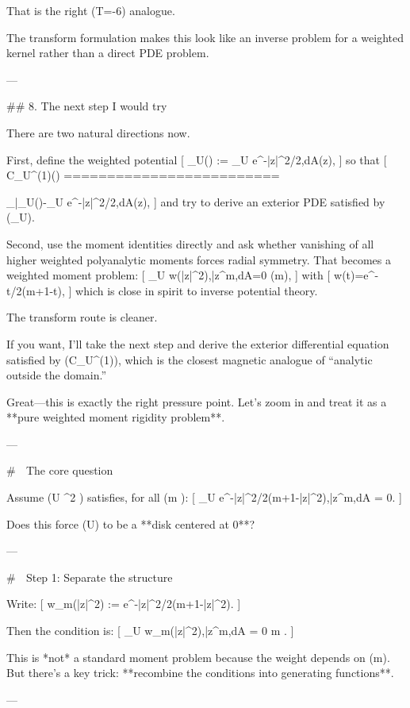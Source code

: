That is the right (T=-6) analogue.

The transform formulation makes this look like an inverse problem for a weighted kernel rather than a direct PDE problem.

---

## 8. The next step I would try

There are two natural directions now.

First, define the weighted potential
[
\Phi_U(\zeta)
:=
\int_U e^{-|z|^2/2},dA(z),
]
so that
[
\mathcal C_U^{(1)}(\zeta)
=========================

\partial_{\bar\zeta}\Phi_U(\zeta)-\int_U e^{-|z|^2/2},dA(z),
]
and try to derive an exterior PDE satisfied by (\Phi_U).

Second, use the moment identities directly and ask whether vanishing of all higher weighted polyanalytic moments forces radial symmetry. That becomes a weighted moment problem:
[
\int_U w(|z|^2),\bar z^m,dA=0
\quad(m),
]
with
[
w(t)=e^{-t/2}(m+1-t),
]
which is close in spirit to inverse potential theory.

The transform route is cleaner.

If you want, I’ll take the next step and derive the exterior differential equation satisfied by (\mathcal C_U^{(1)}), which is the closest magnetic analogue of “analytic outside the domain.”


Great—this is exactly the right pressure point. Let’s zoom in and treat it as a **pure weighted moment rigidity problem**.

---

# 🎯 The core question

Assume (U \subset {}^2 \simeq {}) satisfies, for all (m ):
[
\int_U e^{-|z|^2/2}(m+1-|z|^2),\bar z^m,dA = 0.
]

Does this force (U) to be a **disk centered at 0**?

---

# 🧠 Step 1: Separate the structure

Write:
[
w_m(|z|^2) := e^{-|z|^2/2}(m+1-|z|^2).
]

Then the condition is:
[
\int_U w_m(|z|^2),\bar z^m,dA = 0 \quad \forall m .
]

This is *not* a standard moment problem because the weight depends on (m).
But there’s a key trick: **recombine the conditions into generating functions**.

---

